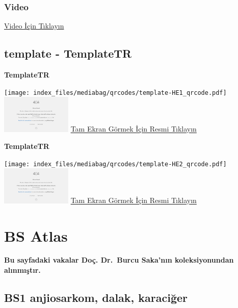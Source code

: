 \documentclass[
  letterpaper,
  DIV=11,
  numbers=noendperiod]{scrreprt}
\begin{document}
\hypertarget{video-40}{%
\subsection{Video}\label{video-40}}

\href{https://www.youtube.com/watch?v=1Qq67jVEfUA}{Video İçin Tıklayın}

\hypertarget{sec-template}{%
\section{template - TemplateTR}\label{sec-template}}

\textbf{TemplateTR}

\texttt{[image: index\_files/mediabag/qrcodes/template-HE1\_qrcode.pdf]}
\href{https://images.patolojiatlasi.com/template/HE1.html}{\includegraphics[width=0.25\textwidth,height=\textheight]{./screenshots/thumbnail_template-HE1.png}}
\href{https://images.patolojiatlasi.com/template/HE1.html}{Tam Ekran
Görmek İçin Resmi Tıklayın}

\textbf{TemplateTR}

\texttt{[image: index\_files/mediabag/qrcodes/template-HE2\_qrcode.pdf]}
\href{https://images.patolojiatlasi.com/template/HE2.html}{\includegraphics[width=0.25\textwidth,height=\textheight]{./screenshots/thumbnail_template-HE2.png}}
\href{https://images.patolojiatlasi.com/template/HE2.html}{Tam Ekran
Görmek İçin Resmi Tıklayın}

\hypertarget{bs-atlas}{%
\chapter{BS Atlas}\label{bs-atlas}}

\textbf{Bu sayfadaki vakalar Doç. Dr.~Burcu Saka'nın koleksiyonundan
alınmıştır.}

\hypertarget{sec-BS1}{%
\section{BS1 anjiosarkom, dalak, karaciğer}\label{sec-BS1}}
\end{document}
